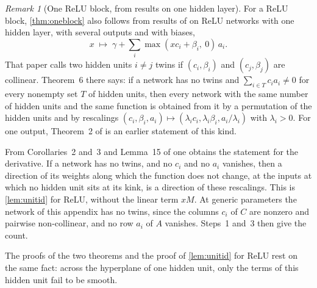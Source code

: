 \documentclass[10pt]{article}
\theoremstyle{definition}
\theoremstyle{remark}
\newtheorem{remark}[theorem]{Remark}
\begin{document}
\begin{remark}[One ReLU block, from results on one hidden layer]\label{rem:relu}
For a ReLU block, \cref{thm:oneblock} also follows from results of \citet{stock2021embedding} on ReLU networks with one hidden layer, with several outputs and with biases,
\[
x \;\mapsto\; \gamma + \sum_{i}\max(xc_i + \beta_i,\ 0)\,a_i .
\]
That paper calls two hidden units $i \neq j$ twins if $(c_i, \beta_i)$ and $(c_j, \beta_j)$ are collinear. Theorem~6 there says: if a network has no twins and $\sum_{i\in T} c_ia_i \neq 0$ for every nonempty set $T$ of hidden units, then every network with the same number of hidden units and the same function is obtained from it by a permutation of the hidden units and by rescalings $(c_i, \beta_i, a_i) \mapsto (\lambda_ic_i, \lambda_i\beta_i, a_i/\lambda_i)$ with $\lambda_i > 0$. For one output, Theorem~2 of \citet{petzka2020symmetries} is an earlier statement of this kind.

From Corollaries~2 and~3 and Lemma~15 of \citet{stock2021embedding} one obtains the statement for the derivative. If a network has no twins, and no $c_i$ and no $a_i$ vanishes, then a direction of its weights along which the function does not change, at the inputs at which no hidden unit sits at its kink, is a direction of these rescalings. This is \cref{lem:unitid} for ReLU, without the linear term $xM$. At generic parameters the network of this appendix has no twins, since the columns $c_i$ of $C$ are nonzero and pairwise non-collinear, and no row $a_i$ of $A$ vanishes. Steps~1 and~3 then give the count.

The proofs of the two theorems and the proof of \cref{lem:unitid} for ReLU rest on the same fact: across the hyperplane of one hidden unit, only the terms of this hidden unit fail to be smooth.
\end{remark}
\end{document}
